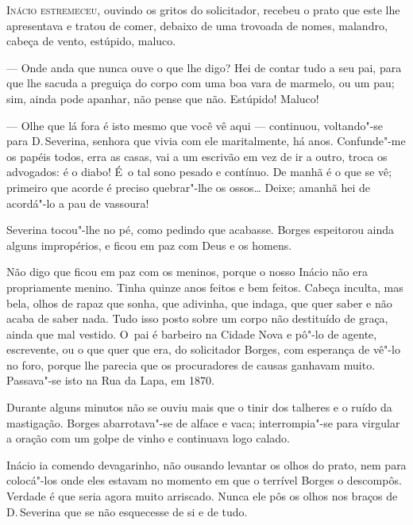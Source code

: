 \begin{linenumbers}

\textsc{Inácio estremeceu,} ouvindo os gritos do solicitador, recebeu o prato que
este lhe apresentava e tratou de comer, debaixo de uma trovoada de
nomes, malandro, cabeça de vento, estúpido, maluco.

--- Onde anda que nunca ouve o que lhe digo? Hei de contar tudo a seu
pai, para que lhe sacuda a preguiça do corpo com uma boa vara de
marmelo, ou um pau; sim, ainda pode apanhar, não pense que não.
Estúpido! Maluco!

--- Olhe que lá fora é isto mesmo que você vê aqui --- continuou,
voltando"-se para D.\,Severina, senhora que vivia com ele maritalmente, há
anos. Confunde"-me os papéis todos, erra as casas, vai a um escrivão em
vez de ir a outro, troca os advogados: é o diabo! É~o tal sono pesado e
contínuo. De manhã é o que se vê; primeiro que acorde é preciso
quebrar"-lhe os ossos\ldots{} Deixe; amanhã hei de acordá"-lo a pau de
vassoura!

Severina tocou"-lhe no pé, como pedindo que acabasse. Borges espeitorou
ainda alguns impropérios, e ficou em paz com Deus e os homens.

Não digo que ficou em paz com os meninos, porque o nosso Inácio não era
propriamente menino. Tinha quinze anos feitos e bem feitos. Cabeça
inculta, mas bela, olhos de rapaz que sonha, que adivinha, que indaga,
que quer saber e não acaba de saber nada. Tudo isso posto sobre um corpo
não destituído de graça, ainda que mal vestido. O~pai é barbeiro na
Cidade Nova e pô"-lo de agente, escrevente, ou o que quer que era, do
solicitador Borges, com esperança de vê"-lo no foro, porque lhe parecia
que os procuradores de causas ganhavam muito. Passava"-se isto na Rua da
Lapa, em 1870.

Durante alguns minutos não se ouviu mais que o tinir dos talheres e o
ruído da mastigação. Borges abarrotava"-se de alface e vaca;
interrompia"-se para virgular a oração com um golpe de vinho e continuava
logo calado.

Inácio ia comendo devagarinho, não ousando levantar os olhos do prato,
nem para colocá"-los onde eles estavam no momento em que o terrível
Borges o descompôs. Verdade é que seria agora muito arriscado. Nunca ele
pôs os olhos nos braços de D.\,Severina que se não esquecesse de si e de
tudo.


\end{linenumbers}
